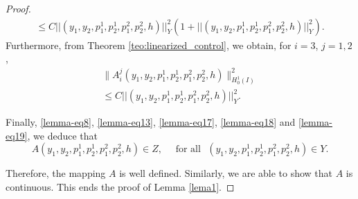 \documentclass[11pt,a4paper]{amsart}
\numberwithin{equation}{section}
\begin{document}
\begin{proof}
\begin{equation}
\begin{array}{l}
    		\leq C  ||(y_1,y_2,p^1_1,p^1_2,p^2_1,p^2_2,h)||^{2}_{Y}(1+ ||(y_1,y_2,p^1_1,p^1_2,p^2_1,p^2_2,h)||^{2}_{Y}).
    	\end{array}
    \end{equation}Furthermore,  from Theorem \ref{teo:linearized_control}, we obtain, for $i=3$, $j=1,2$,
    \begin{equation}\label{lemma-eq19}
        \begin{array}{l}
    	   \parallel A_i^j (y_1,y_2,p^1_1,p^1_2,p^2_1,p^2_2,h) \parallel^2_{H^{1}_{0}(I)}\\[1.0em]
    		
    		\leq C  ||(y_1,y_2,p^1_1,p^1_2,p^2_1,p^2_2,h)||^{2}_{Y}.
        \end{array}
    \end{equation}
    
    Finally, \eqref{lemma-eq8}, \eqref{lemma-eq13}, \eqref{lemma-eq17}, \eqref{lemma-eq18} and \eqref{lemma-eq19}, we  deduce that
    $$
        A(y_1,y_2,p^1_1,p^1_2,p^2_1,p^2_2,h)\in Z,\quad \text{ for all }\,\, (y_1,y_2,p^1_1,p^1_2,p^2_1,p^2_2,h)\in Y.
    $$
    
    \noindent Therefore, the mapping  $A$  is well defined. Similarly, we are able to show that  $A$ is continuous. This ends the proof of Lemma \ref{lema1}.
\end{proof}
\end{document}
